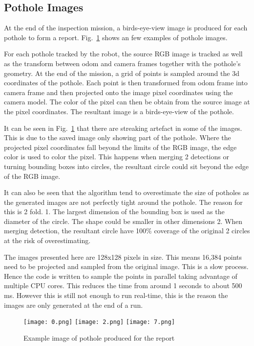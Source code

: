 \documentclass[conference]{IEEEtran}
\begin{document}
\subsection{Pothole Images}

At the end of the inspection mission, a birds-eye-view image is produced for each pothole to form a report. Fig.~\ref{fig:pothole_image} shows an few examples of pothole images.

For each pothole tracked by the robot, the source RGB image is tracked as well as the transform between odom and camera frames together with the pothole's geometry. At the end of the mission, a grid of points is sampled around the 3d coordinates of the pothole. Each point is then transformed from odom frame into camera frame and then projected onto the image pixel coordinates using the camera model. The color of the pixel can then be obtain from the source image at the pixel coordinates. The resultant image is a birds-eye-view of the pothole.

It can be seen in Fig.~\ref{fig:pothole_image} that there are streaking artefact in some of the images. This is due to the saved image only showing part of the pothole. Where the projected pixel coordinates fall beyond the limits of the RGB image, the edge color is used to color the pixel. This happens when merging 2 detections or turning bounding boxes into circles, the resultant circle could sit beyond the edge of the RGB image.

It can also be seen that the algorithm tend to overestimate the size of potholes as the generated images are not perfectly tight around the pothole. The reason for this is 2 fold. 1. The largest dimension of the bounding box is used as the diameter of the circle. The shape could be smaller in other dimensions 2. When merging detection, the resultant circle have 100\% coverage of the original 2 circles at the risk of overestimating.

The images presented here are 128x128 pixels in size. This means 16,384 points need to be projected and sampled from the original image. This is a slow process. Hence the code is written to sample the points in parallel taking advantage of multiple CPU cores. This reduces the time from around 1 seconds to about 500 ms. However this is still not enough to run real-time, this is the reason the images are only generated at the end of a run.


\begin{figure}
    \centering
    \texttt{[image: 0.png]}
    \texttt{[image: 2.png]}
    \texttt{[image: 7.png]}
    \caption{Example image of pothole produced for the report}
    \label{fig:pothole_image}
\end{figure}
\end{document}
